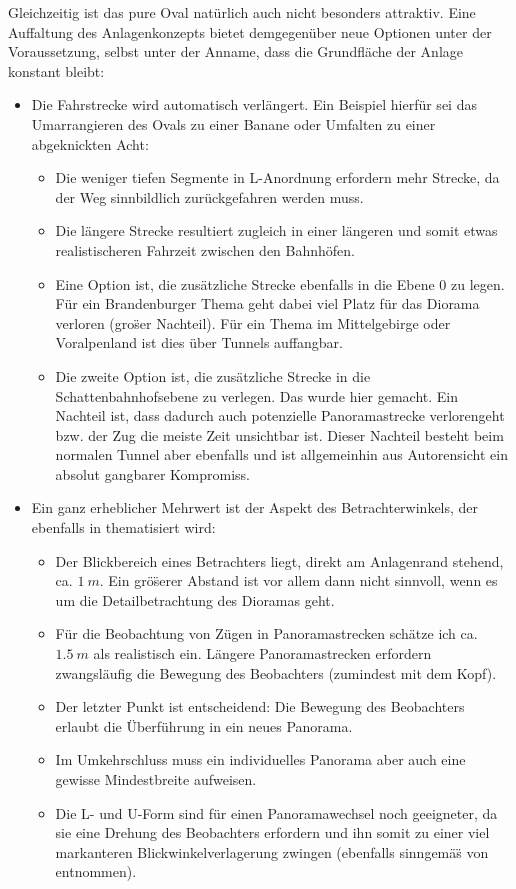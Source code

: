Gleichzeitig ist das pure Oval nat\"urlich auch nicht besonders attraktiv.
Eine Auffaltung des Anlagenkonzepts bietet demgegen\"uber neue Optionen unter der Voraussetzung, selbst unter der Anname, dass die Grundfl\"ache der Anlage konstant bleibt:
\begin{itemize}
	\item Die Fahrstrecke wird automatisch verl\"angert.
	Ein Beispiel hierf\"ur sei das Umarrangieren des Ovals zu einer Banane oder Umfalten zu einer abgeknickten Acht:
	\begin{itemize}
		\item Die weniger tiefen Segmente in L-Anordnung erfordern mehr Strecke, da der Weg sinnbildlich zur\"uckgefahren werden muss.
		\item Die l\"angere Strecke resultiert zugleich in einer l\"angeren und somit etwas realistischeren Fahrzeit zwischen den Bahnh\"ofen.
		\item Eine Option ist, die zus\"atzliche Strecke ebenfalls in die Ebene 0 zu legen.
		F\"ur ein Brandenburger Thema geht dabei viel Platz f\"ur das Diorama verloren (gro\"ser Nachteil).
		F\"ur ein Thema im Mittelgebirge oder Voralpenland ist dies \"uber Tunnels auffangbar.
		\item Die zweite Option ist, die zus\"atzliche Strecke in die Schattenbahnhofsebene zu verlegen.
		Das wurde hier gemacht.
		Ein Nachteil ist, dass dadurch auch potenzielle Panoramastrecke verlorengeht bzw. der Zug die meiste Zeit unsichtbar ist.
		Dieser Nachteil besteht beim normalen Tunnel aber ebenfalls und ist allgemeinhin aus Autorensicht ein absolut gangbarer Kompromiss.
	\end{itemize}
	\item Ein ganz erheblicher Mehrwert ist der Aspekt des Betrachterwinkels, der ebenfalls in \cite{Gee17} thematisiert wird:
	\begin{itemize}
		\item Der Blickbereich eines Betrachters liegt, direkt am Anlagenrand stehend, ca. $1~m$.
		Ein gr\"o\"serer Abstand ist vor allem dann nicht sinnvoll, wenn es um die Detailbetrachtung des Dioramas geht.
		\item F\"ur die Beobachtung von Z\"ugen in Panoramastrecken sch\"atze ich ca. $1.5~m$ als realistisch ein.
		L\"angere Panoramastrecken erfordern zwangsl\"aufig die Bewegung des Beobachters (zumindest mit dem Kopf).
		\item Der letzter Punkt ist entscheidend: Die Bewegung des Beobachters erlaubt die \"Uberf\"uhrung in ein neues Panorama.
		\item Im Umkehrschluss muss ein individuelles Panorama aber auch eine gewisse Mindestbreite aufweisen.
		\item Die L- und U-Form sind f\"ur einen Panoramawechsel noch geeigneter, da sie eine Drehung des Beobachters erfordern und ihn somit zu einer viel markanteren Blickwinkelverlagerung zwingen (ebenfalls sinngem\"a\"s von \cite{Gee17} entnommen).
	\end{itemize}
\end{itemize}


